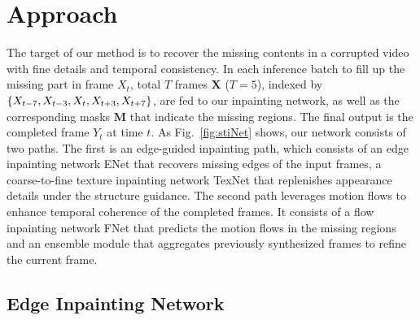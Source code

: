 

\section{Approach}
\label{sec:approach}

The target of our method is to recover the missing contents in a corrupted video with fine details and temporal consistency.
%
In each inference batch to fill up the missing part in frame $X_t$, total $T$ frames $\boldsymbol{X}$ ($T=5$), indexed by $\{X_{t-7},X_{t-3},X_{t},X_{t+3},X_{t+7}\}$, are fed to our inpainting network, as well as the corresponding masks $\boldsymbol{M}$ that indicate the missing regions.
The final output is the completed frame \(Y_t\) at time $t$. 
As Fig.~\ref{fig:stiNet} shows, our network consists of two paths. 
The first is an edge-guided inpainting path, which consists of an edge inpainting network ENet that recovers missing edges of the input frames, a coarse-to-fine texture inpainting network TexNet that replenishes appearance details under the structure guidance.
The second path leverages motion flows to enhance temporal coherence of the completed frames.
It consists of a flow inpainting network FNet that predicts the motion flows in the missing regions and an ensemble module that aggregates previously synthesized frames to refine the current frame. 



\subsection{Edge Inpainting Network}
\label{sec:edgenet}

